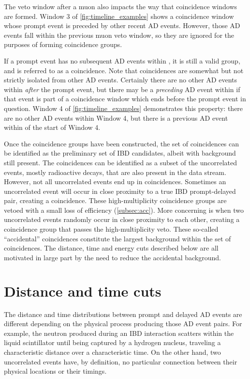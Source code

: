 The veto window after a muon also impacts the way that
coincidence windows are formed.
Window 3 of \cref{fig:timeline_examples} shows a coincidence window
whose prompt event is preceded by other recent AD events.
However, those AD events fall within the previous muon veto window,
so they are ignored for the purposes of forming coincidence groups.

If a prompt event has no subsequent AD events within \tc, it is
still a valid group, and is referred to as a  coincidence.
Note that  coincidences are somewhat but not strictly isolated
from other AD events.
Certainly there are no other AD events
within \tc{} \textit{after} the prompt event,
but there may be a \textit{preceding} AD event within \tc{}
if that event is part of a coincidence window
which ends before the prompt event in question.
Window 4 of \cref{fig:timeline_examples} demonstrates this property:
there are no other AD events within Window 4,
but there is a previous AD event within \tc{} of the start of Window 4.

Once the coincidence groups have been constructed,
the set of  coincidences can be identified as
the preliminary set of IBD candidates,
albeit with background still present.
The  coincidences can be identified as a subset
of the uncorrelated events, mostly radioactive decays,
that are also present in the data stream.
However, not all uncorrelated events end up in  coincidences.
Sometimes an uncorrelated event will occur in close proximity to
a true IBD prompt-delayed pair, creating a  coincidence.
These high-multiplicity coincidence groups are vetoed
with a small loss of efficiency (\cref{subsec:acc}).
More concerning is when two uncorrelated events
randomly occur in close proximity to each other,
creating a  coincidence group that passes the high-multiplicity veto.
These so-called ``accidental'' coincidences
constitute the largest background within the set of  coincidences.
The distance, time and energy cuts described below
are all motivated in large part by the need to reduce the accidental background.

\section{Distance and time cuts}

The distance and time distributions between prompt and delayed AD events
are different depending on the physical process producing those AD event pairs.
For example, the neutron produced during an IBD interaction
scatters within the liquid scintillator until being captured
by a hydrogen nucleus,
traveling a characteristic distance over a characteristic time.
On the other hand, two uncorrelated events have, by definition,
no particular connection between their physical locations
or their timings.

